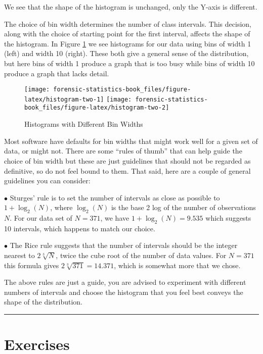 \documentclass[
]{book}
\begin{document}
We see that the shape of the histogram is unchanged, only the Y-axis is
different.

The choice of bin width determines the number of class intervals.
This decision, along with the choice of starting point for the first interval,
affects the shape of the histogram. In Figure \ref{fig:histogram-two} we see
histograms for our data using bins of width 1 (left) and width 10 (right).
These both give a general sense of the distribution, but here bins of width 1
produce a graph that is too busy while bins of width 10 produce a graph that
lacks detail.

\begin{figure}
\texttt{[image: forensic-statistics-book\_files/figure-latex/histogram-two-1]} \texttt{[image: forensic-statistics-book\_files/figure-latex/histogram-two-2]} \caption{Histograms with Different Bin Widths}\label{fig:histogram-two}
\end{figure}

Most software have defaults for bin widths that might work well for a given set
of data, or might not. There are some ``rules of thumb'' that can help guide
the choice of bin width but these are just guidelines that should not be
regarded as definitive, so do not feel bound to them. That said, here are
a couple of general guidelines you can consider:

\(\bullet\) Sturges' rule is to set the number of intervals as close as possible to
\(1 + \log_2(N)\), where \(\log_2(N)\) is the base 2 log of the number of
observations \(N\). For our data set of \(N = 371\), we have \(1 + \log_2(N) = 9.535\)
which suggests 10 intervals, which happens to match our choice.

\(\bullet\) The Rice rule suggests that the number of intervals should be the integer
nearest to \(2\sqrt[3]{N}\), twice the cube root of the number of data values.
For \(N = 371\) this formula gives \(2\sqrt[3]{371} = 14.371\), which is somewhat more
that we chose.

The above rules are just a guide, you are advised to experiment with different
numbers of intervals and choose the histogram that you feel best conveys the
shape of the distribution.

\begin{center}\rule{0.5\linewidth}{0.5pt}\end{center}

\hypertarget{exercises-3}{%
\section{Exercises}\label{exercises-3}}
\end{document}
